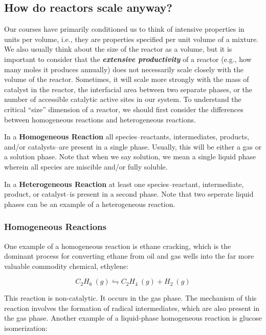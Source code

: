 \documentclass[11pt]{article}
\begin{document}
    \hypertarget{how-do-reactors-scale-anyway}{%
\subsection{How do reactors scale
anyway?}\label{how-do-reactors-scale-anyway}}

Our courses have primarily conditioned us to think of intensive
properties in units per volume, i.e., they are properties specified per
unit volume of a mixture. We also usually think about the size of the
reactor as a volume, but it is important to consider that the
\textbf{\emph{extensive productivity}} of a reactor (e.g., how many
moles it produces annually) does not necessarily scale closely with the
volume of the reactor. Sometimes, it will scale more strongly with the
mass of catalyst in the reactor, the interfacial area between two
separate phases, or the number of accessible catalytic active sites in
our system. To understand the critical ``size'' dimension of a reactor,
we should first consider the differences between homogeneous reactions
and heterogeneous reactions.

In a \textbf{Homogeneous Reaction} all species--reactants,
intermediates, products, and/or catalysts--are present in a single
phase. Usually, this will be either a gas or a solution phase. Note that
when we say solution, we mean a single liquid phase wherein all species
are miscible and/or fully soluble.

In a \textbf{Heterogeneous Reaction} at least one species--reactant,
intermediate, product, or catalyst--is present in a second phase. Note
that two seperate liquid phases can be an example of a heterogeneous
reaction.

    \hypertarget{homogeneous-reactions}{%
\subsubsection{Homogeneous Reactions}\label{homogeneous-reactions}}

One example of a homogeneous reaction is ethane cracking, which is the
dominant process for converting ethane from oil and gas wells into the
far more valuable commodity chemical, ethylene:

\[C_2H_6 \ (g) \leftrightharpoons C_2H_4 \ (g) + H_2 \ (g)\]

This reaction is non-catalytic. It occurs in the gas phase. The
mechanism of this reaction involves the formation of radical
intermediates, which are also present in the gas phase. Another example
of a liquid-phase homogeneous reaction is glucose isomerization:
\end{document}
